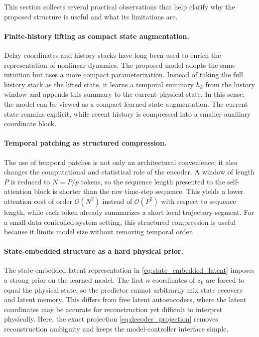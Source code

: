 \documentclass[journal]{IEEEtran}
\begin{document}
This section collects several practical observations that help clarify why the proposed structure is useful and what its limitations are.

\paragraph{Finite-history lifting as compact state augmentation.}
Delay coordinates and history stacks have long been used to enrich the representation of nonlinear dynamics. The proposed model adopts the same intuition but uses a more compact parameterization. Instead of taking the full history stack as the lifted state, it learns a temporal summary $h_k$ from the history window and appends this summary to the current physical state. In this sense, the model can be viewed as a compact learned state augmentation. The current state remains explicit, while recent history is compressed into a smaller auxiliary coordinate block.

\paragraph{Temporal patching as structured compression.}
The use of temporal patches is not only an architectural convenience; it also changes the computational and statistical role of the encoder. A window of length $P$ is reduced to $N=P/p$ tokens, so the sequence length presented to the self-attention block is shorter than the raw time-step sequence. This yields a lower attention cost of order $\mathcal{O}(N^2)$ instead of $\mathcal{O}(P^2)$ with respect to sequence length, while each token already summarizes a short local trajectory segment. For a small-data controlled-system setting, this structured compression is useful because it limits model size without removing temporal order.

\paragraph{State-embedded structure as a hard physical prior.}
The state-embedded latent representation in \eqref{eq:state_embedded_latent} imposes a strong prior on the learned model. The first $n$ coordinates of $z_k$ are forced to equal the physical state, so the predictor cannot arbitrarily mix state recovery and latent memory. This differs from free latent autoencoders, where the latent coordinates may be accurate for reconstruction yet difficult to interpret physically. Here, the exact projection \eqref{eq:decoder_projection} removes reconstruction ambiguity and keeps the model-controller interface simple.
\end{document}
